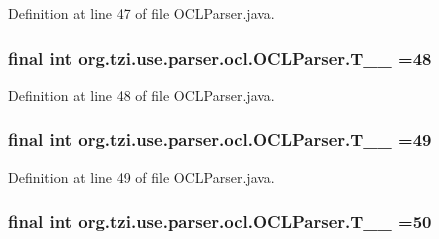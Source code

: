 Definition at line 47 of file O\-C\-L\-Parser.\-java.

\hypertarget{classorg_1_1tzi_1_1use_1_1parser_1_1ocl_1_1_o_c_l_parser_a635ed73d7fe98305494d21186e17fe88}{
\subsubsection[{T\-\_\-\-\_\-48}]{\setlength{\rightskip}{0pt plus 5cm}final int org.\-tzi.\-use.\-parser.\-ocl.\-O\-C\-L\-Parser.\-T\-\_\-\-\_ =48\hspace{0.3cm}{\ttfamily [static]}}}\label{classorg_1_1tzi_1_1use_1_1parser_1_1ocl_1_1_o_c_l_parser_a635ed73d7fe98305494d21186e17fe88}


Definition at line 48 of file O\-C\-L\-Parser.\-java.

\hypertarget{classorg_1_1tzi_1_1use_1_1parser_1_1ocl_1_1_o_c_l_parser_a1638f4d86ef7c515621a0e453b7f5657}{
\subsubsection[{T\-\_\-\-\_\-49}]{\setlength{\rightskip}{0pt plus 5cm}final int org.\-tzi.\-use.\-parser.\-ocl.\-O\-C\-L\-Parser.\-T\-\_\-\-\_ =49\hspace{0.3cm}{\ttfamily [static]}}}\label{classorg_1_1tzi_1_1use_1_1parser_1_1ocl_1_1_o_c_l_parser_a1638f4d86ef7c515621a0e453b7f5657}


Definition at line 49 of file O\-C\-L\-Parser.\-java.

\hypertarget{classorg_1_1tzi_1_1use_1_1parser_1_1ocl_1_1_o_c_l_parser_a859fe9f94171469dfff2f5b098ee28a9}{
\subsubsection[{T\-\_\-\-\_\-50}]{\setlength{\rightskip}{0pt plus 5cm}final int org.\-tzi.\-use.\-parser.\-ocl.\-O\-C\-L\-Parser.\-T\-\_\-\-\_ =50\hspace{0.3cm}{\ttfamily [static]}}}\label{classorg_1_1tzi_1_1use_1_1parser_1_1ocl_1_1_o_c_l_parser_a859fe9f94171469dfff2f5b098ee28a9}



